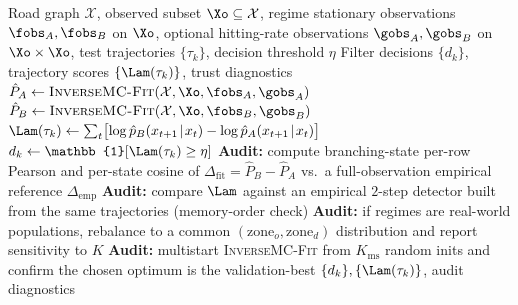 \begin{algorithm}[H]
\caption{Partial-observation routing-influence filter}
\label{alg:filter}
\begin{algorithmic}[1]
\Require Road graph $\mathcal{X}$, observed subset $\Xo \subseteq \mathcal{X}$,
  regime stationary observations $\fobs_A, \fobs_B$ on $\Xo$,
  optional hitting-rate observations $\gobs_A, \gobs_B$ on $\Xo \times \Xo$,
  test trajectories $\{\tau_k\}$, decision threshold $\eta$
\Ensure Filter decisions $\{d_k\}$, trajectory scores $\{\Lam(\tau_k)\}$, trust diagnostics
\State $\hat{P}_A \gets \textsc{InverseMC-Fit}(\mathcal{X}, \Xo, \fobs_A, \gobs_A)$ 
\State $\hat{P}_B \gets \textsc{InverseMC-Fit}(\mathcal{X}, \Xo, \fobs_B, \gobs_B)$ 
  \State $\Lam(\tau_k) \gets \sum_t \bigl[\log \hat{p}_B(x_{t+1}\!\mid\!x_t) - \log \hat{p}_A(x_{t+1}\!\mid\!x_t)\bigr]$
  \State $d_k \gets \mathbb{1}[\Lam(\tau_k) \ge \eta]$ 
\EndFor
\State \textbf{Audit:} compute branching-state per-row Pearson and per-state cosine of
  $\Delta_{\mathrm{fit}} = \hat{P}_B - \hat{P}_A$ vs.\ a full-observation empirical
  reference $\Delta_{\mathrm{emp}}$
\State \textbf{Audit:} compare $\Lam$ against an empirical $2$-step detector built
  from the same trajectories (memory-order check)
\State \textbf{Audit:} if regimes are real-world populations, rebalance to a
  common $(\mathrm{zone}_o, \mathrm{zone}_d)$ distribution and report sensitivity to $K$
\State \textbf{Audit:} multistart \textsc{InverseMC-Fit} from $K_{\mathrm{ms}}$
  random inits and confirm the chosen optimum is the validation-best
\State \Return $\{d_k\}, \{\Lam(\tau_k)\}$, audit diagnostics
\end{algorithmic}
\end{algorithm}

